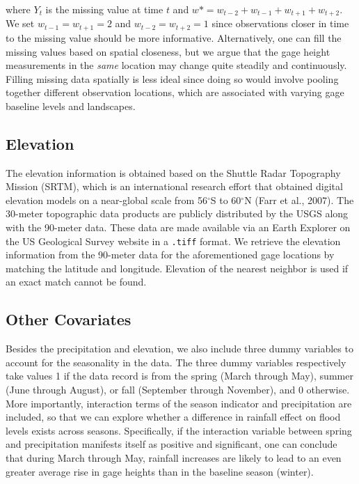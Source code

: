\noindent where $Y_t$  is the missing value at time $t$ and $ w* =w_{t-2} + w_{t-1}+ w_{t+1} + w_{t+2}$. We set $ w_{t-1} = w_{t+1} = 2$ and $ w_{t-2} = w_{t+2} = 1$ since  observations closer in time to the missing value should be more informative.
Alternatively, one can fill the missing values based on spatial closeness, but we argue that the gage height measurements in the \emph{same} location may change quite steadily and continuously. Filling missing data spatially is less ideal since doing so would involve pooling together different observation locations, which are associated with varying gage baseline levels and landscapes.


\subsection{Elevation}
The elevation information  is obtained based on the Shuttle Radar Topography Mission (SRTM), which is an international research effort that obtained digital elevation models on a near-global scale from 56$^\circ$S to 60$^\circ$N (Farr et al., 2007). The 30-meter topographic data products are  publicly distributed by the USGS along with the 90-meter data. These data are made available via an Earth Explorer on the US Geological Survey website in a \texttt{.tiff} format. We retrieve the elevation information from the 90-meter data for the aforementioned gage locations by matching the latitude and longitude. Elevation of the nearest neighbor is used if an exact match cannot be found. 


\subsection{Other Covariates}
Besides the precipitation and elevation, we also include three dummy variables to account for the seasonality in the data. The three dummy variables respectively take values 1 if the data record is from the spring (March through May), summer (June through August), or fall (September through November), and 0 otherwise. More importantly, interaction terms of the season indicator and precipitation are included, so that we can explore whether a difference in rainfall effect on flood levels exists across seasons. Specifically, if  the interaction variable between spring and precipitation manifests itself as  positive and significant, one can conclude that during March through May, rainfall increases are likely to lead to an even greater average rise in gage heights than in the baseline season (winter). 

